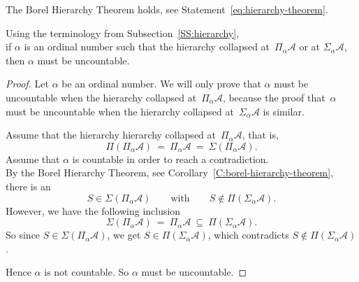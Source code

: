 \documentclass[main.tex]{subfiles}
\begin{document}
\begin{cor}
\label{C:borel-hierarchy-theorem}
The Borel Hierarchy Theorem holds,
see Statement~\eqref{eq:hierarchy-theorem}.
\end{cor}

\begin{prop}
\label{P:no-countable-collapse}
Using the terminology from Subsection~\ref{SS:hierarchy},\\
if $\alpha$ is an ordinal number
such that the hierarchy collapsed at~$\Pi_\alpha \mathcal{A}$
or at $\Sigma_\alpha \mathcal{A} $,\\
then $\alpha$ must be uncountable.
\end{prop}
\begin{proof}
Let $\alpha$ be an ordinal number.
We will only prove that
$\alpha$ must be uncountable when
 the hierarchy collapsed at~$\Pi_\alpha\mathcal{A}$,
because the
proof that~$\alpha$
must be uncountable when the hierarchy collapsed
at~$\Sigma_\alpha\mathcal{A}$ is similar.

Assume that the hierarchy hierarchy collapsed at~$\Pi_\alpha\mathcal{A}$,
that is,
\begin{equation*}
\Pi(\Pi_\alpha \mathcal{A}) 
\ =\ 
\Pi_\alpha \mathcal{A}
\ =\ 
\Sigma(\Pi_\alpha \mathcal{A}).
\end{equation*}
Assume that $\alpha$ is countable in order to reach a contradiction.\\
By the Borel Hierarchy Theorem,
see Corollary~\eqref{C:borel-hierarchy-theorem},
there is an 
\begin{equation*}
S\in \Sigma(\Pi_\alpha \mathcal{A})
\qquad\text{with}\qquad
S\notin \Pi(\Sigma_\alpha \mathcal{A}).
\end{equation*}
However,
we have the following inclusion
\begin{equation*}
\Sigma(\Pi_\alpha \mathcal{A}) \ = \ 
\Pi_\alpha \mathcal{A} \ \subseteq\ \Pi(\Sigma_\alpha \mathcal{A}).
\end{equation*}
So since $S\in \Sigma(\Pi_\alpha\mathcal{A})$,
we get $S\in \Pi(\Sigma_\alpha \mathcal{A})$,
which contradicts $S\notin \Pi(\Sigma_\alpha\mathcal{A})$.

Hence $\alpha$ is not countable.
So $\alpha$ must be uncountable.
\end{proof}
\end{document}
